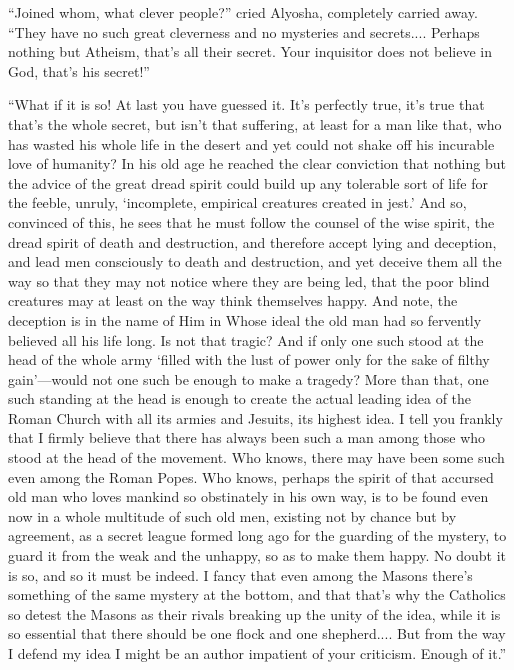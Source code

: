 ``Joined whom, what clever people?'' cried Alyosha, completely carried
away. ``They have no such great cleverness and no mysteries and
secrets.... Perhaps nothing but Atheism, that's all their secret. Your
inquisitor does not believe in God, that's his secret!''


``What if it is so! At last you have guessed it. It's perfectly true,
it's true that that's the whole secret, but isn't that suffering, at
least for a man like that, who has wasted his whole life in the desert
and yet could not shake off his incurable love of humanity? In his old
age he reached the clear conviction that nothing but the advice of the
great dread spirit could build up any tolerable sort of life for the
feeble, unruly, `incomplete, empirical creatures created in jest.' And
so, convinced of this, he sees that he must follow the counsel of the
wise spirit, the dread spirit of death and destruction, and therefore
accept lying and deception, and lead men consciously to death and
destruction, and yet deceive them all the way so that they may not
notice where they are being led, that the poor blind creatures may at
least on the way think themselves happy. And note, the deception is in
the name of Him in Whose ideal the old man had so fervently believed
all his life long. Is not that tragic? And if only one such stood at
the head of the whole army `filled with the lust of power only for the
sake of filthy gain'---would not one such be enough to make a tragedy?
More than that, one such standing at the head is enough to create the
actual leading idea of the Roman Church with all its armies and
Jesuits, its highest idea. I tell you frankly that I firmly believe
that there has always been such a man among those who stood at the
head of the movement. Who knows, there may have been some such even
among the Roman Popes. Who knows, perhaps the spirit of that accursed
old man who loves mankind so obstinately in his own way, is to be
found even now in a whole multitude of such old men, existing not by
chance but by agreement, as a secret league formed long ago for the
guarding of the mystery, to guard it from the weak and the unhappy, so
as to make them happy. No doubt it is so, and so it must be indeed. I
fancy that even among the Masons there's something of the same mystery
at the bottom, and that that's why the Catholics so detest the Masons
as their rivals breaking up the unity of the idea, while it is so
essential that there should be one flock and one shepherd....
 But from the way I defend my idea I might be an author
impatient of your criticism. Enough of it.''

